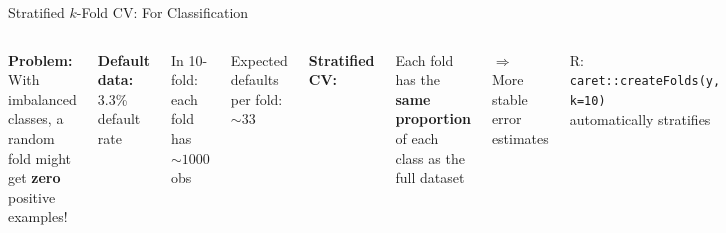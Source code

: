 \documentclass[aspectratio=169, 11pt]{beamer}
\begin{document}
\begin{frame}{Stratified $k$-Fold CV: For Classification}
\begin{columns}
\textbf{Problem:} With imbalanced classes, a random fold might get \textbf{zero} positive examples!

\vspace{0.3em}
\textbf{Default data:} 3.3\% default rate

In 10-fold: each fold has $\sim 1000$ obs

Expected defaults per fold: $\sim 33$

\vspace{0.3em}
\textbf{Stratified CV:}

Each fold has the \textbf{same proportion} of each class as the full dataset

$\Rightarrow$ More stable error estimates


\vspace{0.3em}
\footnotesize R: \texttt{caret::createFolds(y, k=10)}\\
automatically stratifies
\end{columns}
\end{frame}
\end{document}
